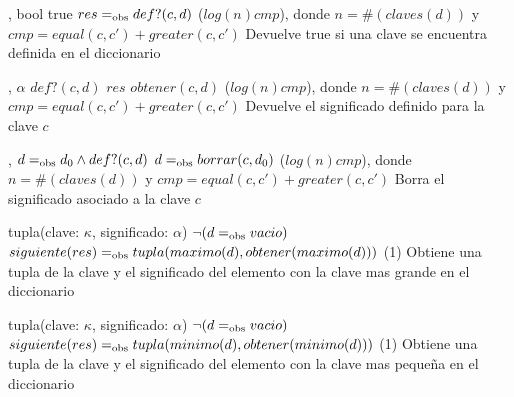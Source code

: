 {   ,
    }
{bool}
{true}
{$res =_{\mathrm{obs}} def?(c, d)$}
{\bigo($log(n)cmp$), donde $n = \#(claves(d))$ y $cmp = equal(c, c')+greater(c, c')$}
{}
{Devuelve true si una clave se encuentra definida en el diccionario}

{   ,
    }
{$\alpha$}
{$def?(c, d)$}
{$res$ \igobs $obtener(c, d)$}
{\bigo($log(n)cmp$), donde $n = \#(claves(d))$ y $cmp = equal(c, c')+greater(c, c')$}
{}
{Devuelve el significado definido para la clave $c$}

{   ,
    }
{}
{$d =_{\mathrm{obs}} d_0 \land def?(c, d)$}
{$d =_{\mathrm{obs}} borrar(c, d_0)$}
{\bigo($log(n)cmp$), donde $n = \#(claves(d))$ y $cmp = equal(c, c')+greater(c, c')$}
{}
{Borra el significado asociado a la clave $c$}


{   }
{tupla(clave: $\kappa$, significado: $\alpha$)}
{$\neg (d =_{\mathrm{obs}} vacio)$}
{$siguiente(res) =_{\mathrm{obs}} tupla(maximo(d), obtener(maximo(d)))$}
{\bigo(1)}
{}
{Obtiene una tupla de la clave y el significado del elemento con la clave 
    mas grande en el diccionario}

{   }
{tupla(clave: $\kappa$, significado: $\alpha$)}
{$\neg (d =_{\mathrm{obs}} vacio)$}
{$siguiente(res) =_{\mathrm{obs}} tupla(minimo(d), obtener(minimo(d)))$}
{\bigo(1)}
{}
{Obtiene una tupla de la clave y el significado del elemento con la clave 
    mas pequeña en el diccionario}

